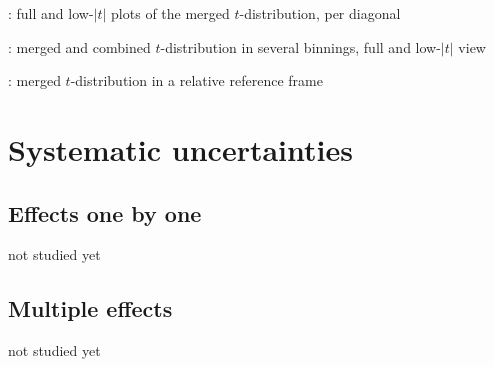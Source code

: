 \>  : full and low-$|t|$ plots of the merged $t$-distribution, per diagonal

\>  : merged and combined $t$-distribution in several binnings, full and low-$|t|$ view

\>  : merged $t$-distribution in a relative reference frame


\section{Systematic uncertainties}

\subsection{Effects one by one}

\> not studied yet

\subsection{Multiple effects}

\> not studied yet



\bye
